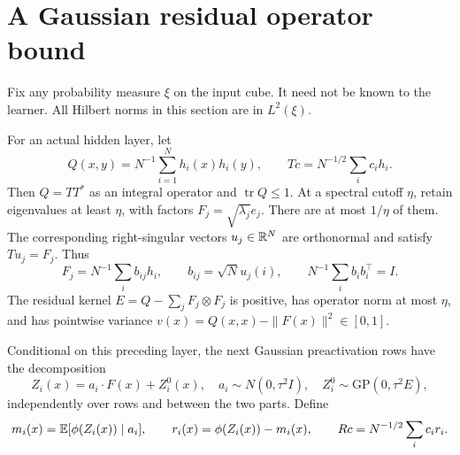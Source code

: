 \section{A Gaussian residual operator bound}
\label{sec:residual}
Fix any probability measure $\xi$ on the input cube. It need not be known to the learner. All Hilbert norms in this section are in $L^2(\xi)$.

For an actual hidden layer, let
\[
 Q(x,y)=N^{-1}\sum_{i=1}^Nh_i(x)h_i(y),
 \qquad T c=N^{-1/2}\sum_i c_i h_i.
\]
Then $Q=TT^*$ as an integral operator and $\operatorname{tr}Q\le1$. At a spectral cutoff $\eta$, retain eigenvalues at least $\eta$, with factors $F_j=\sqrt{\lambda_j}e_j$. There are at most $1/\eta$ of them. The corresponding right-singular vectors $u_j\in\mathbb R^N$ are orthonormal and satisfy $T u_j=F_j$. Thus
\[
 F_j=N^{-1}\sum_i b_{ij}h_i,\qquad b_{ij}=\sqrt N u_j(i),
 \qquad N^{-1}\sum_i b_ib_i^\top=I.
\]
The residual kernel $E=Q-\sum_jF_j\otimes F_j$ is positive, has operator norm at most $\eta$, and has pointwise variance
$v(x)=Q(x,x)-\|F(x)\|^2\in[0,1]$.

Conditional on this preceding layer, the next Gaussian preactivation rows have the decomposition
\begin{equation}
 Z_i(x)=a_i\cdot F(x)+Z_i^0(x),
 \quad a_i\sim N(0,\tau^2I),\quad Z_i^0\sim\mathrm{GP}(0,\tau^2E),
 \label{eq:direct-decomposition}
\end{equation}
independently over rows and between the two parts. Define
\[
 m_i(x)=\mathbb E[\phi(Z_i(x))\mid a_i],\qquad
 r_i(x)=\phi(Z_i(x))-m_i(x),\qquad
 R c=N^{-1/2}\sum_i c_i r_i.
\]

